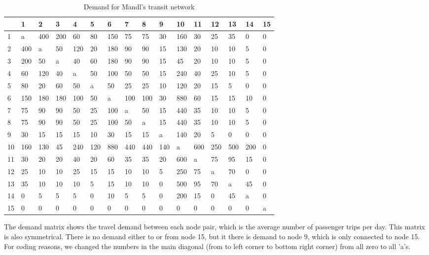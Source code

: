 \begin{table}[H]
\label{tbl:mandlDemand}
\resizebox{12.5cm}{!} {
 

    \begin{tabular}{|l|lllllllllllllll|}
    \hline
    ~ & 1       & 2        &  3    &   4     &  5     &  6      & 7      &  8     & 9      & 10      & 11     & 12         &  13     & 14       &  15  \\
    \hline
    1 & a   & 400 & 200 & 60  & 80  & 150 & 75  & 75  & 30  & 160 & 30  & 25  & 35  & 0   & 0 \\
    2 & 400 & a   & 50  & 120 & 20  & 180 & 90  & 90  & 15  & 130 & 20  & 10  & 10  & 5   & 0 \\
    3 & 200 & 50  & a   & 40  & 60  & 180 & 90  & 90  & 15  & 45  & 20  & 10  & 10  & 5   & 0 \\
    4 & 60  & 120 & 40  & a   & 50  & 100 & 50  & 50  & 15  & 240 & 40  & 25  & 10  & 5   & 0 \\
    5 & 80  & 20  & 60  & 50  & a   & 50  & 25  & 25  & 10  & 120 & 20  & 15  & 5   & 0   & 0 \\
    6 & 150 & 180 & 180 & 100 & 50  & a   & 100 & 100 & 30  & 880 & 60  & 15  & 15  & 10  & 0 \\
    7 & 75  & 90  & 90  & 50  & 25  & 100 & a   & 50  & 15  & 440 & 35  & 10  & 10  & 5   & 0 \\
    8 & 75  & 90  & 90  & 50  & 25  & 100 & 50  & a   & 15  & 440 & 35  & 10  & 10  & 5   & 0 \\
    9 & 30  & 15  & 15  & 15  & 10  & 30  & 15  & 15  & a   & 140 & 20  & 5   & 0   & 0   & 0 \\
    10 & 160 & 130 & 45  & 240 & 120 & 880 & 440 & 440 & 140 & a   & 600 & 250 & 500 & 200 & 0 \\
    11 & 30  & 20  & 20  & 40  & 20  & 60  & 35  & 35  & 20  & 600 & a   & 75  & 95  & 15  & 0 \\
    12 & 25  & 10  & 10  & 25  & 15  & 15  & 10  & 10  & 5   & 250 & 75  & a   & 70  & 0   & 0 \\
    13 & 35  & 10  & 10  & 10  & 5   & 15  & 10  & 10  & 0   & 500 & 95  & 70  & a   & 45  & 0 \\
    14 & 0   & 5   & 5   & 5   & 0   & 10  & 5   & 5   & 0   & 200 & 15  & 0   & 45  & a   & 0 \\
    15 & 0   & 0   & 0   & 0   & 0   & 0   & 0   & 0   & 0   & 0   & 0   & 0   & 0   & 0   & a \\ 
    \hline
    \end{tabular}
    }
 	\caption {Demand for Mandl's transit network}
 	\label{table:MandlDemand}
 	The demand matrix shows the travel demand between each node pair, which is the average number of passenger trips per day. This matrix is also symmetrical. There is no demand either to or from node 15, but it there is demand to node 9, which is only connected to node 15. For coding reasons, we changed the numbers in the main diagonal (from to left corner to bottom right corner) from all zero to all ’a’s.

\end{table}

